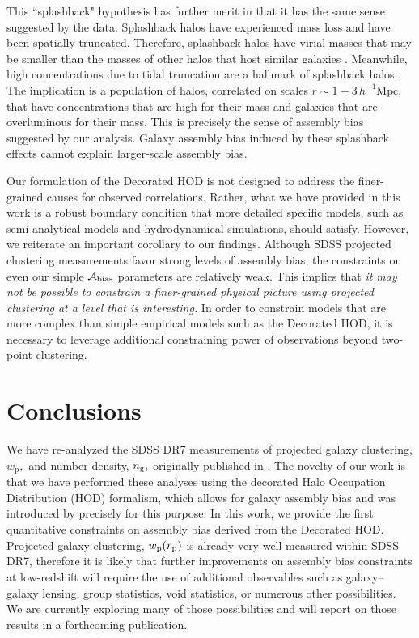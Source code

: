 \documentclass[usenatbib,usegraphicx,letterpaper]{mn2e}
\newcommand{\abias}{\mathcal{A}_{\rm bias}}
\newcommand{\wprp}{w_{\mathrm{p}}}
\begin{document}
This ``splashback" hypothesis has further merit in that it has the same sense suggested 
by the data. Splashback halos have experienced mass loss and have been spatially truncated. 
Therefore, splashback halos have virial masses that may be smaller than the masses of other 
halos that host similar galaxies \citet{dalal_etal08}. Meanwhile, high concentrations due 
to tidal truncation are a hallmark of splashback halos 
\citep{wang_etal07,dalal_etal08,sunayama_etal16}. 
The implication is a population 
of halos, correlated on scales $r \sim 1-3\, h^{-1}\mathrm{Mpc}$, that have concentrations 
that are high for their mass and galaxies that are overluminous for their mass. This is precisely the 
sense of assembly bias suggested by our analysis. 
Galaxy assembly bias induced by these 
splashback effects cannot explain larger-scale assembly bias.


Our formulation of the Decorated HOD is not designed to address 
the finer-grained causes for observed correlations. 
Rather, what we have provided in this work is a robust boundary condition 
that more detailed specific models, such as semi-analytical models 
and hydrodynamical simulations, should satisfy. 
However, we reiterate an important corollary to our findings. 
Although SDSS projected clustering measurements favor strong levels of assembly bias, 
the constraints on even our simple $\abias$ parameters are relatively weak. 
This implies that {\em it may not be possible to constrain a finer-grained physical 
picture using projected clustering at a level that is interesting.} 
In order to constrain models that are more complex than simple empirical models 
such as the Decorated HOD, it is necessary to leverage additional constraining power of 
observations beyond two-point clustering. 


\section{Conclusions}
\label{section:conclusions}

We have re-analyzed the SDSS DR7 measurements of projected galaxy clustering,
$\wprp,$ and number density, $n_{\rm g},$ originally published in \citet{zehavi_etal11}.
The novelty of our work is that we have performed these analyses using the
decorated Halo Occupation Distribution (HOD) formalism, which allows for galaxy
assembly bias and was introduced by \citet{hearin_etal16} precisely for this purpose.
In this work, we provide the first quantitative constraints on
assembly bias derived from the Decorated HOD. Projected galaxy clustering, 
$\wprp(r_{\rm p})$ is already very well-measured within SDSS DR7, therefore it is likely 
that further improvements on assembly bias constraints at low-redshift will require the use of additional 
observables such as galaxy--galaxy lensing, group statistics, void statistics, or numerous other possibilities. 
We are currently exploring many of those possibilities and will report on those results in a forthcoming publication. 
\end{document}
